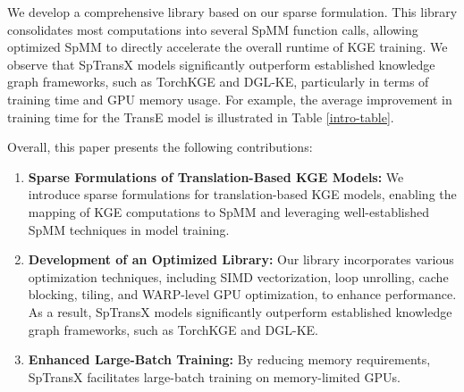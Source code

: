 We develop a comprehensive library based on our sparse formulation. This library consolidates most computations into several SpMM function calls, allowing optimized SpMM to directly accelerate the overall runtime of KGE training.  We observe that SpTransX models significantly outperform established knowledge graph frameworks, such as TorchKGE and DGL-KE, particularly in terms of training time and GPU memory usage. For example, the average improvement in training time for the TransE model is illustrated in Table \ref{intro-table}.

Overall, this paper presents the following contributions:
\vspace{-0.2cm}
\begin{enumerate}
    \item {\bf Sparse Formulations of Translation-Based KGE Models:} We introduce sparse formulations for translation-based KGE models, enabling the mapping of KGE computations to SpMM and leveraging well-established SpMM techniques in model training.
    \item {\bf Development of an Optimized Library:} Our library incorporates various optimization techniques, including SIMD vectorization, loop unrolling, cache blocking, tiling, and WARP-level GPU optimization, to enhance performance. As a result, SpTransX models significantly outperform established knowledge graph frameworks, such as TorchKGE and DGL-KE.
    \item {\bf Enhanced Large-Batch Training:} By reducing memory requirements, SpTransX facilitates large-batch training on memory-limited GPUs.

\end{enumerate}









